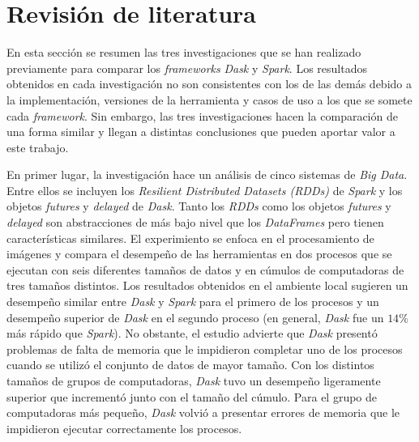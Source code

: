 \chapter{Revisión de literatura}

\noindent En esta sección se resumen las tres investigaciones que se han realizado previamente para comparar los \textit{frameworks} \textit{Dask} y \textit{Spark}. Los resultados obtenidos en cada investigación no son consistentes con los de las demás debido a la implementación, versiones de la herramienta y casos de uso a los que se somete cada \textit{framework}. Sin embargo, las tres investigaciones hacen la comparación de una forma similar y llegan a distintas conclusiones que pueden aportar valor a este trabajo.

En primer lugar, la investigación \cite{comparative-evolution} hace un análisis de cinco sistemas de \textit{Big Data}. Entre ellos se incluyen los \textit{Resilient Distributed Datasets (RDDs)} de \textit{Spark} y los objetos \textit{futures} y \textit{delayed} de \textit{Dask}. Tanto los \textit{RDDs} como los objetos \textit{futures} y \textit{delayed} son abstracciones de más bajo nivel que los \textit{DataFrames} pero tienen características similares. El experimiento se enfoca en el procesamiento de imágenes y compara el desempeño de las herramientas en dos procesos que se ejecutan con seis diferentes tamaños de datos y en cúmulos de computadoras de tres tamaños distintos. Los resultados obtenidos en el ambiente local sugieren un desempeño similar entre \textit{Dask} y \textit{Spark} para el primero de los procesos y un desempeño superior de \textit{Dask} en el segundo proceso (en general, \textit{Dask} fue un $14\%$ más rápido que \textit{Spark}). No obstante, el estudio advierte que \textit{Dask} presentó problemas de falta de memoria que le impidieron completar uno de los procesos cuando se utilizó el conjunto de datos de mayor tamaño. Con los distintos tamaños de grupos de computadoras, \textit{Dask} tuvo un desempeño ligeramente superior que incrementó junto con el tamaño del cúmulo. Para el grupo de computadoras más pequeño, \textit{Dask} volvió a presentar errores de memoria que le impidieron ejecutar correctamente los procesos.

